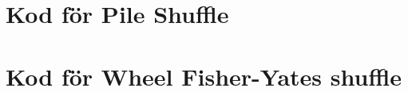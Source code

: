 \documentclass[swedish,a4paper]{article}
\begin{document}
\section{Kod för Pile Shuffle}
\label{app:pile}
% 

\section{Kod för Wheel Fisher-Yates shuffle}
\label{app:wheel}
% 


%
\end{document}
